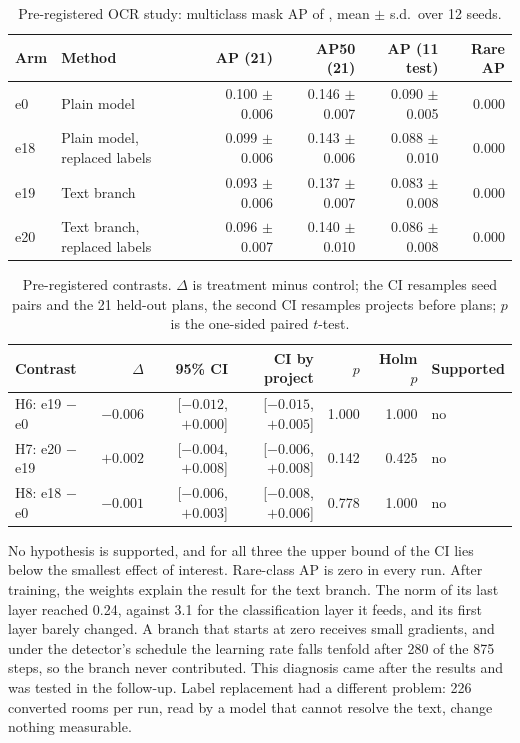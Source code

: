 \begin{table}[H]
\centering
\caption{Pre-registered OCR study: multiclass mask AP of , mean
$\pm$ s.d.\ over 12 seeds.}
\label{tab:ocrarms}
\small
\begin{tabular}{@{}llrrrr@{}}
\toprule
Arm & Method & AP (21) & AP50 (21) & AP (11 test) & Rare AP \\
\midrule
e0 & Plain model & 0.100 $\pm$ 0.006 & 0.146 $\pm$ 0.007 & 0.090 $\pm$ 0.005 & 0.000 \\
e18 & Plain model, replaced labels & 0.099 $\pm$ 0.006 & 0.143 $\pm$ 0.006 & 0.088 $\pm$ 0.010 & 0.000 \\
e19 & Text branch & 0.093 $\pm$ 0.006 & 0.137 $\pm$ 0.007 & 0.083 $\pm$ 0.008 & 0.000 \\
e20 & Text branch, replaced labels & 0.096 $\pm$ 0.007 & 0.140 $\pm$ 0.010 & 0.086 $\pm$ 0.008 & 0.000 \\
\bottomrule
\end{tabular}
\end{table}

\begin{table}[H]
\centering
\caption{Pre-registered contrasts. $\Delta$ is treatment minus control; the CI
resamples seed pairs and the 21 held-out plans, the second CI resamples
projects before plans; $p$ is the one-sided paired $t$-test.}
\label{tab:ocrtests}
\small
\begin{tabular}{@{}lrrrrrl@{}}
\toprule
Contrast & $\Delta$ & 95\% CI & CI by project & $p$ & Holm $p$ & Supported \\
\midrule
H6: e19 $-$ e0 & $-0.006$ & [$-0.012$, $+0.000$] & [$-0.015$, $+0.005$] & 1.000 & 1.000 & no \\
H7: e20 $-$ e19 & $+0.002$ & [$-0.004$, $+0.008$] & [$-0.006$, $+0.008$] & 0.142 & 0.425 & no \\
H8: e18 $-$ e0 & $-0.001$ & [$-0.006$, $+0.003$] & [$-0.008$, $+0.006$] & 0.778 & 1.000 & no \\
\bottomrule
\end{tabular}
\end{table}

No hypothesis is supported, and for all three the upper bound of the CI lies
below the smallest effect of interest. Rare-class AP is zero in every run.
After training, the weights explain the result for the text branch. The norm of
its last layer reached 0.24, against 3.1 for the classification layer it feeds,
and its first layer barely changed. A branch that starts at
zero receives small gradients, and under the detector's schedule the learning
rate falls tenfold after 280 of the 875 steps, so the branch never contributed.
This diagnosis came after the results and was tested in the follow-up. Label
replacement had a different problem: 226 converted rooms per run, read by a
model that cannot resolve the text, change nothing measurable.


